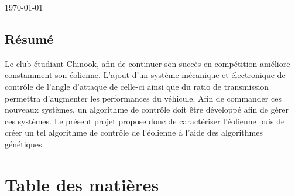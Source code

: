 \documentclass[11pt]{article}
\begin{document}
\begin{titlepage}
\vfill



{\large \today}\\[3cm] %


 

\end{titlepage}


\vspace*{\fill}
\begin{center}
\section*{Résumé}
\end{center}

Le club étudiant Chinook, afin de continuer son succès en compétition améliore constamment son éolienne. L'ajout d'un système mécanique et électronique de contrôle de l'angle d'attaque de celle-ci ainsi que du ratio de transmission permettra d'augmenter les performances du véhicule. Afin de commander ces nouveaux systèmes, un algorithme de contrôle doit être développé afin de gérer ces systèmes. Le présent projet propose donc de caractériser l'éolienne puis de créer un tel algorithme de contrôle de l'éolienne à l'aide des algorithmes génétiques.

\vspace*{\fill}
\clearpage


\section*{Table des matières}

\renewcommand{\contentsname}{Table des matières}
\makeatletter
\renewcommand{\tableofcontents}{%
}
\makeatother

\tableofcontents

\end{document}
